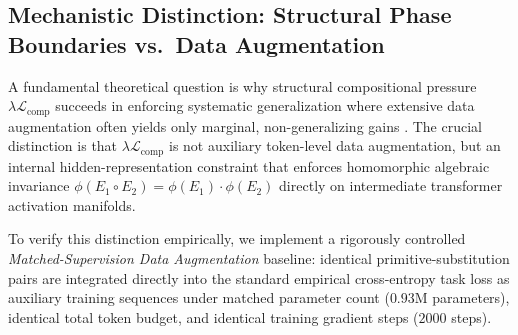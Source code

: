 \documentclass{article}
\theoremstyle{plain}
\theoremstyle{definition}
\begin{document}
\subsection{Mechanistic Distinction: Structural Phase Boundaries vs.\ Data Augmentation}
\label{sec:data_aug_distinction}
A fundamental theoretical question is why structural compositional pressure $\lambda \mathcal{L}_{\text{comp}}$ succeeds in enforcing systematic generalization where extensive data augmentation often yields only marginal, non-generalizing gains \citep{Furrer2020Compositional,Jia2016Data}. The crucial distinction is that $\lambda \mathcal{L}_{\text{comp}}$ is not auxiliary token-level data augmentation, but an internal hidden-representation constraint that enforces homomorphic algebraic invariance $\phi(E_1 \circ E_2) = \phi(E_1) \cdot \phi(E_2)$ directly on intermediate transformer activation manifolds.

To verify this distinction empirically, we implement a rigorously controlled \emph{Matched-Supervision Data Augmentation} baseline: identical primitive-substitution pairs are integrated directly into the standard empirical cross-entropy task loss as auxiliary training sequences under matched parameter count ($0.93\text{M}$ parameters), identical total token budget, and identical training gradient steps ($2000$ steps).
\end{document}
